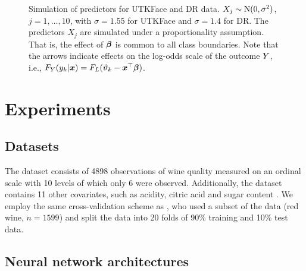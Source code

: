 \documentclass[article,nojss,shortnames]{jss}\usepackage[]{graphicx}\usepackage[]{color}
\begin{document}
\begin{figure}
\centering
{}
\caption{Simulation of predictors for UTKFace and DR data. $X_j \sim \operatorname{N}(0, \sigma^2)$,
$j = 1, \dots, 10$, with $\sigma = 1.55$ for UTKFace and $\sigma = 1.4$ for DR.
The predictors $X_j$ are simulated under a proportionality assumption. That is,
the effect of $\text{\boldmath$\beta$}$ is common to all class boundaries. Note that the arrows
indicate effects on the log-odds scale of the outcome $Y$, i.e.,
$F_Y(y_k \rvert \boldsymbol x) = F_L(\vartheta_k - \boldsymbol x^\top\text{\boldmath$\beta$})$.} \label{fig:sim}
\end{figure}

\section{Experiments} \label{sec:experiments}

\subsection{Datasets}

 The  dataset consists of 4898 observations of wine
quality measured on an ordinal scale with 10 levels of which only 6 were observed.
Additionally, the dataset contains 11 other covariates, such as acidity, citric acid and
sugar content \citep{cortez2009modeling}.
We employ the same cross-validation scheme as \citet{gal2015dropout}, who used a
subset of the data (red wine, $n = 1599$) and split the data into 20 folds of
90\% training and 10\% test data.

\subsection{Neural network architectures}
\end{document}
